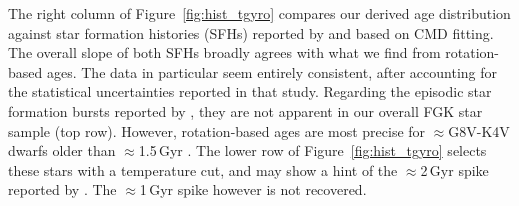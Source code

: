 \documentclass[11pt,twocolumn,tighten]{aastex63}
\begin{document}
The right column of Figure~\ref{fig:hist_tgyro} compares our derived age distribution
against star formation histories (SFHs) reported by
\citet{2019A&A...624L...1M} and \citet{2020NatAs...4..965R} based on
CMD fitting.
The overall slope of both SFHs broadly agrees with what we find from rotation-based ages.
The \citet{2019A&A...624L...1M} data in particular seem entirely consistent, after
accounting for the statistical uncertainties reported in that study.
Regarding the episodic star formation bursts reported by
\citet{2020NatAs...4..965R}, they are not apparent in our overall FGK star sample (top row).
However, rotation-based ages are most precise for $\approx$G8V-K4V dwarfs older than $\approx$1.5\,Gyr
\citep{Bouma_2023}.
The lower row of Figure~\ref{fig:hist_tgyro} selects these stars with a temperature cut, and
may show a hint of the $\approx$2\,Gyr spike reported by 
\citet{2020NatAs...4..965R}.
The $\approx$1\,Gyr spike however is not recovered.


%



\end{document}
